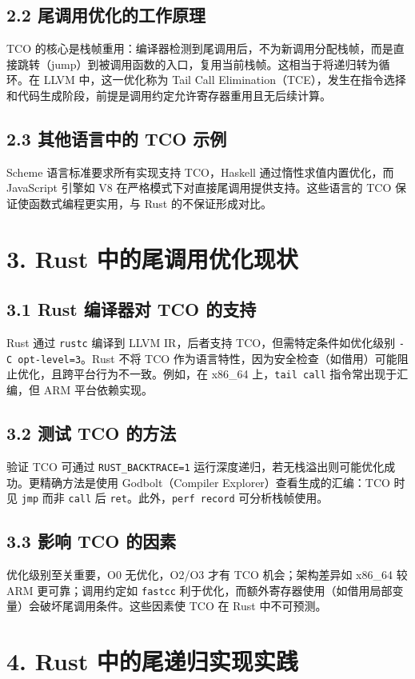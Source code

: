 \section{2.2 尾调用优化的工作原理}
TCO 的核心是栈帧重用：编译器检测到尾调用后，不为新调用分配栈帧，而是直接跳转（jump）到被调用函数的入口，复用当前栈帧。这相当于将递归转为循环。在 LLVM 中，这一优化称为 Tail Call Elimination（TCE），发生在指令选择和代码生成阶段，前提是调用约定允许寄存器重用且无后续计算。\par
\section{2.3 其他语言中的 TCO 示例}
Scheme 语言标准要求所有实现支持 TCO，Haskell 通过惰性求值内置优化，而 JavaScript 引擎如 V8 在严格模式下对直接尾调用提供支持。这些语言的 TCO 保证使函数式编程更实用，与 Rust 的不保证形成对比。\par
\chapter{3. Rust 中的尾调用优化现状}
\section{3.1 Rust 编译器对 TCO 的支持}
Rust 通过 \texttt{rustc} 编译到 LLVM IR，后者支持 TCO，但需特定条件如优化级别 \texttt{-C opt-level=3}。Rust 不将 TCO 作为语言特性，因为安全检查（如借用）可能阻止优化，且跨平台行为不一致。例如，在 x86\_{}64 上，\texttt{tail call} 指令常出现于汇编，但 ARM 平台依赖实现。\par
\section{3.2 测试 TCO 的方法}
验证 TCO 可通过 \texttt{RUST\_{}BACKTRACE=1} 运行深度递归，若无栈溢出则可能优化成功。更精确方法是使用 Godbolt（Compiler Explorer）查看生成的汇编：TCO 时见 \texttt{jmp} 而非 \texttt{call} 后 \texttt{ret}。此外，\texttt{perf record} 可分析栈帧使用。\par
\section{3.3 影响 TCO 的因素}
优化级别至关重要，O0 无优化，O2/O3 才有 TCO 机会；架构差异如 x86\_{}64 较 ARM 更可靠；调用约定如 \texttt{fastcc} 利于优化，而额外寄存器使用（如借用局部变量）会破坏尾调用条件。这些因素使 TCO 在 Rust 中不可预测。\par
\chapter{4. Rust 中的尾递归实现实践}
